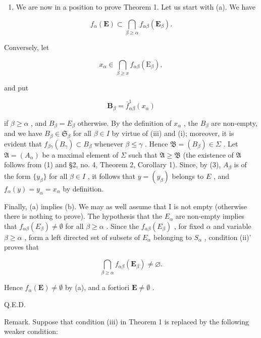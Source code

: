 \begin{enumerate}
\def\labelenumi{(\arabic{enumi})}
\setcounter{enumi}{3}
\tightlist
\item
  We are now in a position to prove Theorem 1. Let us start with (a). We have
\end{enumerate}

\[
f _ {\alpha} (\mathbf {E}) \subset \bigcap_ {\beta \geqslant \alpha} f _ {\alpha \beta} (\mathbf {E} _ {\beta}).
\]

Conversely, let

\[
x _ {\alpha} \in \bigcap_ {\beta \geqslant x} f _ {\alpha \beta} (\mathrm{E} _ {\beta}),
\]

and put

\[
\mathbf {B} _ {\beta} = \overline {{f}} _ {\alpha \beta} ^ {1} (x _ {\alpha})
\]

if \(\beta \geqslant \alpha\) , and \(B_{\beta} = E_{\beta}\) otherwise. By the definition of \(x_{\alpha}\) , the \(B_{\beta}\) are non-empty, and we have \(B_{\beta} \in \mathfrak{S}_{\beta}\) for all \(\beta \in I\) by virtue of (iii) and (i); moreover, it is evident that \(f_{\beta \gamma}(B_{\gamma}) \subset B_{\beta}\) whenever \(\beta \leqslant \gamma\) . Hence \(\mathfrak{B} = (B_{\beta}) \in \Sigma\) . Let \(\mathfrak{A} = (A_{\alpha})\) be a maximal element of \(\Sigma\) such that \(\mathfrak{A} \geqslant \mathfrak{B}\) (the existence of \(\mathfrak{A}\) follows from (1) and §2, no. 4, Theorem 2, Corollary 1). Since, by (3), \(A_{\beta}\) is of the form \(\{y_{\beta}\}\) for all \(\beta \in I\) , it follows that \(y = (y_{\beta})\) belongs to \(E\) , and \(f_{\alpha}(y) = y_{\alpha} = x_{\alpha}\) by definition.

Finally, (a) implies (b). We may as well assume that I is not empty (otherwise there is nothing to prove). The hypothesis that the \(E_{\alpha}\) are non-empty implies that \(f_{\alpha\beta}(E_{\beta}) \neq \emptyset\) for all \(\beta \geqslant \alpha\) . Since the \(f_{\alpha\beta}(E_{\beta})\) , for fixed \(\alpha\) and variable \(\beta \geqslant \alpha\) , form a left directed set of subsets of \(E_{\alpha}\) belonging to \(S_{\alpha}\) , condition (ii)' proves that

\[
\bigcap_ {\beta \geqslant \alpha} f _ {\alpha \beta} (\mathbf {E} _ {\beta}) \neq \varnothing .
\]

Hence \(f_{\alpha}(\mathbf{E}) \neq \emptyset\) by (a), and a fortiori \(\mathbf{E} \neq \emptyset\) .

Q.E.D.

Remark. Suppose that condition (iii) in Theorem 1 is replaced by the following weaker condition:

